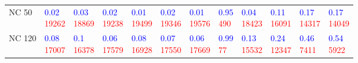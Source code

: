 \begin{tabular}{llllllllllll}
NC 50  &  \makecell{\textcolor{blue}{0.02} \\ \textcolor{red}{19262}} &  \makecell{\textcolor{blue}{0.03} \\ \textcolor{red}{18869}} &  \makecell{\textcolor{blue}{0.02} \\ \textcolor{red}{19238}} &  \makecell{\textcolor{blue}{0.01} \\ \textcolor{red}{19499}} &  \makecell{\textcolor{blue}{0.02} \\ \textcolor{red}{19346}} &  \makecell{\textcolor{blue}{0.01} \\ \textcolor{red}{19576}} &   \makecell{\textcolor{blue}{0.95} \\ \textcolor{red}{490}} &  \makecell{\textcolor{blue}{0.04} \\ \textcolor{red}{18423}} &  \makecell{\textcolor{blue}{0.11} \\ \textcolor{red}{16091}} &  \makecell{\textcolor{blue}{0.17} \\ \textcolor{red}{14317}} &  \makecell{\textcolor{blue}{0.17} \\ \textcolor{red}{14049}} \\
NC 120 &  \makecell{\textcolor{blue}{0.08} \\ \textcolor{red}{17007}} &   \makecell{\textcolor{blue}{0.1} \\ \textcolor{red}{16378}} &  \makecell{\textcolor{blue}{0.06} \\ \textcolor{red}{17579}} &  \makecell{\textcolor{blue}{0.08} \\ \textcolor{red}{16928}} &  \makecell{\textcolor{blue}{0.07} \\ \textcolor{red}{17550}} &  \makecell{\textcolor{blue}{0.06} \\ \textcolor{red}{17669}} &    \makecell{\textcolor{blue}{0.99} \\ \textcolor{red}{77}} &  \makecell{\textcolor{blue}{0.13} \\ \textcolor{red}{15532}} &  \makecell{\textcolor{blue}{0.24} \\ \textcolor{red}{12347}} &   \makecell{\textcolor{blue}{0.46} \\ \textcolor{red}{7411}} &   \makecell{\textcolor{blue}{0.54} \\ \textcolor{red}{5922}} \\

\end{tabular}
